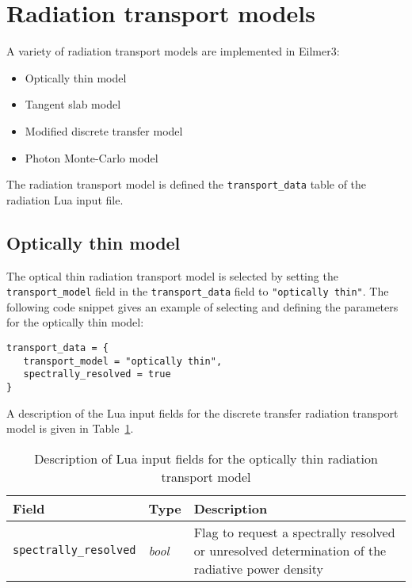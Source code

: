 \section{Radiation transport models}
\label{app:rt-models}

A variety of radiation transport models are implemented in Eilmer3:

\begin{itemize}
 \item Optically thin model
 \item Tangent slab model 
 \item Modified discrete transfer model
 \item Photon Monte-Carlo model
\end{itemize}

The radiation transport model is defined the \texttt{transport\_data} table of the radiation Lua input file.

\subsection{Optically thin model}

The optical thin radiation transport model is selected by setting the \texttt{transport\_model} field in the \texttt{transport\_data} field to \texttt{"optically thin"}.
The following code snippet gives an example of selecting and defining the parameters for the optically thin model:

\noindent \topbar
\begin{lstlisting}[basicstyle=\ttfamily\normalsize]
transport_data = {
   transport_model = "optically thin",
   spectrally_resolved = true
}
\end{lstlisting}
\bottombar

A description of the Lua input fields for the discrete transfer radiation transport model is given in Table~\ref {tab:OT-input}.

\begin{table}[h]
 \begin{center}
  \caption{Description of Lua input fields for the optically thin radiation transport model}
  \label{tab:OT-input}
\begin{tabular}{llp{8cm}}
 \hline \hline
 Field                                                   & Type                 &  Description \\ \hline
\texttt{spectrally\_resolved}            & \textit{bool}       &  Flag to request a spectrally resolved or unresolved determination of the radiative power density \\
\hline
\end{tabular}
\end{center}
\end{table}

